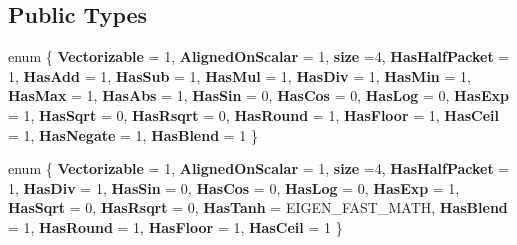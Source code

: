 \subsection*{Public Types}
\begin{DoxyCompactItemize}
\item 
\mbox{\label{struct_eigen_1_1internal_1_1packet__traits_3_01float_01_4_a12e33c7eaf84a1c1e3da960a80c4ae36}} 
enum \{ \newline
{\bfseries Vectorizable} = 1, 
{\bfseries Aligned\+On\+Scalar} = 1, 
{\bfseries size} =4, 
{\bfseries Has\+Half\+Packet} = 1, 
\newline
{\bfseries Has\+Add} = 1, 
{\bfseries Has\+Sub} = 1, 
{\bfseries Has\+Mul} = 1, 
{\bfseries Has\+Div} = 1, 
\newline
{\bfseries Has\+Min} = 1, 
{\bfseries Has\+Max} = 1, 
{\bfseries Has\+Abs} = 1, 
{\bfseries Has\+Sin} = 0, 
\newline
{\bfseries Has\+Cos} = 0, 
{\bfseries Has\+Log} = 0, 
{\bfseries Has\+Exp} = 1, 
{\bfseries Has\+Sqrt} = 0, 
\newline
{\bfseries Has\+Rsqrt} = 0, 
{\bfseries Has\+Round} = 1, 
{\bfseries Has\+Floor} = 1, 
{\bfseries Has\+Ceil} = 1, 
\newline
{\bfseries Has\+Negate} = 1, 
{\bfseries Has\+Blend} = 1
 \}
\item 
\mbox{\label{struct_eigen_1_1internal_1_1packet__traits_3_01float_01_4_a414864855de58e68b23d8952e1871126}} 
enum \{ \newline
{\bfseries Vectorizable} = 1, 
{\bfseries Aligned\+On\+Scalar} = 1, 
{\bfseries size} =4, 
{\bfseries Has\+Half\+Packet} = 1, 
\newline
{\bfseries Has\+Div} = 1, 
{\bfseries Has\+Sin} = 0, 
{\bfseries Has\+Cos} = 0, 
{\bfseries Has\+Log} = 0, 
\newline
{\bfseries Has\+Exp} = 1, 
{\bfseries Has\+Sqrt} = 0, 
{\bfseries Has\+Rsqrt} = 0, 
{\bfseries Has\+Tanh} = E\+I\+G\+E\+N\+\_\+\+F\+A\+S\+T\+\_\+\+M\+A\+TH, 
\newline
{\bfseries Has\+Blend} = 1, 
{\bfseries Has\+Round} = 1, 
{\bfseries Has\+Floor} = 1, 
{\bfseries Has\+Ceil} = 1
 \}
\item 
\mbox{\label{struct_eigen_1_1internal_1_1packet__traits_3_01float_01_4_a764a6dfe0fc863deb7b10de64f5689de}} 

\end{DoxyCompactItemize}
